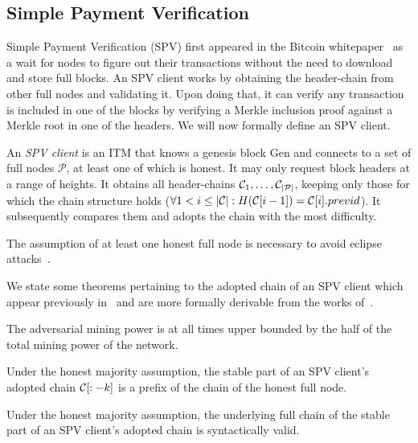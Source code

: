 \subsection{Simple Payment Verification}
Simple Payment Verification (SPV) first appeared in the Bitcoin whitepaper~\cite{bitcoin} as a wait for nodes to figure out their transactions without the need to download and store full blocks. An SPV client works by obtaining the header-chain from other full nodes and validating it. Upon doing that, it can verify any transaction is included in one of the blocks by verifying a Merkle inclusion proof against a Merkle root in one of the headers. We will now formally define an SPV client.

\begin{definition}
An \emph{SPV client} is an ITM that knows a genesis block \textsf{Gen} and connects to a set of full nodes $\mathcal{P}$, at least one of which is honest. It may only request block headers at a range of heights. It obtains all header-chains $\mathcal{C}_1, \dots, \mathcal{C}_{|\mathcal{P}|}$, keeping only those for which the chain structure holds ($\forall 1 < i \le |\mathcal{C}|: H(\mathcal{C}[i-1]) = \mathcal{C}[i].previd$). It subsequently compares them and adopts the chain with the most difficulty.
\end{definition}

The assumption of at least one honest full node is necessary to avoid eclipse attacks~\cite{eclipse,eclipse-ethereum}.

We state some theorems pertaining to the adopted chain of an SPV client which appear previously in~\cite{sok} and are more formally derivable from the works of~\cite{backbone,garay2017bitcoin,pass2017analysis}.

\begin{definition}
The adversarial mining power is at all times upper bounded by the half of the total mining power of the network.
\end{definition}

\begin{theorem}
Under the honest majority assumption, the stable part of an SPV client's adopted chain $\mathcal{C}[:-k]$ is a prefix of the chain of the honest full node.
\end{theorem}

\begin{corollary}
Under the honest majority assumption, the underlying full chain of the stable part of an SPV client's adopted chain is syntactically valid.
\end{corollary}
